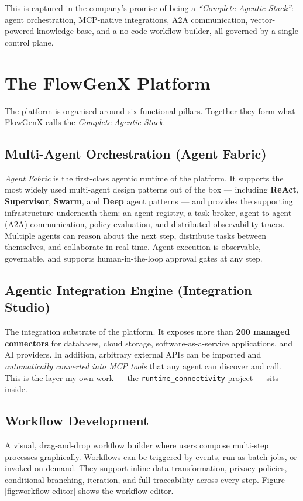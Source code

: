 This is captured in the company's promise of being a
\emph{``Complete Agentic Stack''}: agent orchestration, MCP-native
integrations, A2A communication, vector-powered knowledge base, and a
no-code workflow builder, all governed by a single control plane.

\section{The FlowGenX Platform}
The platform is organised around six functional pillars. Together they
form what FlowGenX calls the \emph{Complete Agentic Stack}.

\subsection{Multi-Agent Orchestration (Agent Fabric)}
\emph{Agent Fabric} is the first-class agentic runtime of the
platform. It supports the most widely used multi-agent design
patterns out of the box --- including \textbf{ReAct},
\textbf{Supervisor}, \textbf{Swarm}, and \textbf{Deep} agent patterns
--- and provides the supporting infrastructure underneath them: an
agent registry, a task broker, agent-to-agent (A2A) communication,
policy evaluation, and distributed observability traces. Multiple
agents can reason about the next step, distribute tasks between
themselves, and collaborate in real time. Agent execution is
observable, governable, and supports human-in-the-loop approval
gates at any step.

\subsection{Agentic Integration Engine (Integration Studio)}
The integration substrate of the platform. It exposes more than
\textbf{200 managed connectors} for databases, cloud storage,
software-as-a-service applications, and AI providers. In addition,
arbitrary external APIs can be imported and \emph{automatically
converted into MCP tools} that any agent can discover and call. This
is the layer my own work --- the
\texttt{runtime\_connectivity} project --- sits inside.

\subsection{Workflow Development}
A visual, drag-and-drop workflow builder where users compose
multi-step processes graphically. Workflows can be triggered by
events, run as batch jobs, or invoked on demand. They support inline
data transformation, privacy policies, conditional branching,
iteration, and full traceability across every step. Figure
\ref{fig:workflow-editor} shows the workflow editor.

